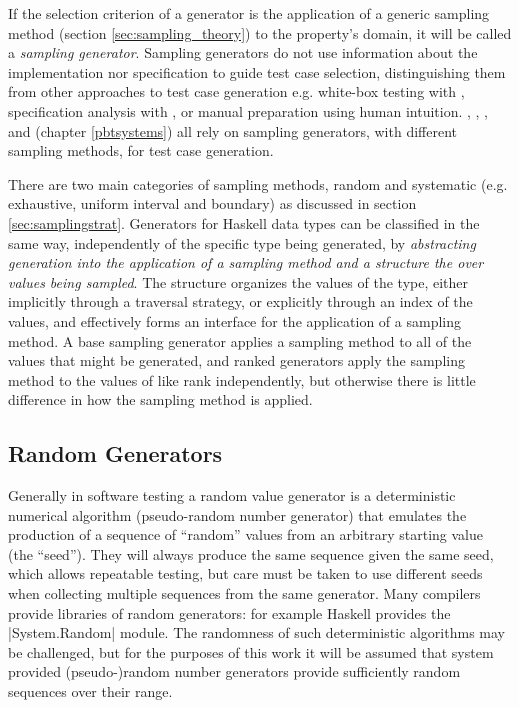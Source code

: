 
If the selection criterion of a generator is
the application of a generic sampling method (section \ref{sec:sampling_theory})
to the property's domain,
it will be called a \emph{sampling generator}.
Sampling generators do not use information about 
the implementation nor specification to guide test case selection,
distinguishing them from other approaches to test case generation
e.g. white-box testing with \DAISTS, 
specification analysis with \HOLTG, 
or manual preparation using human intuition.
\QC, \SC, \GAST, \EC and \FEAT (chapter \ref{pbtsystems})
all rely on sampling generators,
with different sampling methods,
for test case generation.

There are two main categories of sampling methods,
random and systematic (e.g. exhaustive, uniform interval and boundary)
as discussed in section \ref{sec:samplingstrat}.
Generators for Haskell data types can be classified in the same way,
independently of the specific type being generated,
by \emph{abstracting generation into the application of a sampling method
and a structure the over values being sampled}.
The structure organizes the values of the type,
either implicitly through a traversal strategy,
or explicitly through an index of the values,
and effectively forms an interface for the application of a sampling method.
A base sampling generator applies a sampling method to all of the values that might be generated,
and ranked generators apply the sampling method to the values of like rank independently,
but otherwise there is little difference in how the sampling method is applied.


\subsection{Random Generators}

Generally in software testing  a random value generator 
is a deterministic numerical algorithm (pseudo-random number generator) that 
emulates the production of a sequence of ``random'' values
from an arbitrary starting value (the ``seed'').
They will always produce the same sequence given the same seed,
which allows repeatable testing,
but care must be taken to use different seeds
when collecting multiple sequences from the same generator.
Many compilers provide libraries of random generators:
for example Haskell provides the |System.Random| module.
The randomness of such deterministic algorithms may be challenged,
but for the purposes of this work it will be assumed that system provided
(pseudo-)random number generators provide 
sufficiently random sequences over their range.

